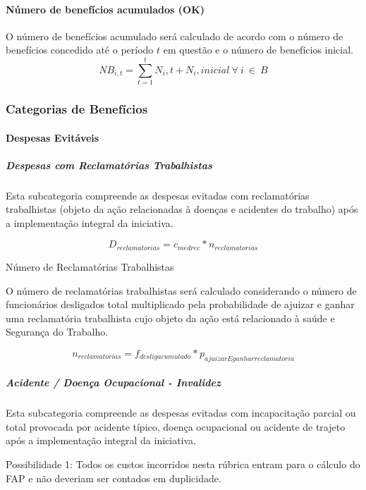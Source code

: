 \documentclass[]{article}
\let\oldparagraph\paragraph
\renewcommand{\paragraph}[1]{\oldparagraph{#1}\mbox{}}
\let\oldsubparagraph\subparagraph
\renewcommand{\subparagraph}[1]{\oldsubparagraph{#1}\mbox{}}
\begin{document}
\paragraph{Número de benefícios acumulados
(OK)}\label{numero-de-beneficios-acumulados-ok}

O número de benefícios acumulado será calculado de acordo com o número
de benefícios concedido até o período \(t\) em questão e o número de
benefícios inicial.
\[NB_{i,t} = \sum_{t=1}^{t} N_i,t + N_i,inicial \ \forall \ i \  \in \ B\]

\subsubsection{Categorias de Benefícios}\label{categorias-de-beneficios}

\paragraph{Despesas Evitáveis}\label{despesas-evitaveis}

\subparagraph{Despesas com Reclamatórias
Trabalhistas}\label{despesas-com-reclamatorias-trabalhistas}

Esta subcategoria compreende as despesas evitadas com reclamatórias
trabalhistas (objeto da ação relacionadas à doenças e acidentes do
trabalho) após a implementação integral da iniciativa.

\[{D}_{reclamatorias} = c_{medrec}*n_{reclamatorias} \]

Número de Reclamatórias Trabalhistas

O número de reclamatórias trabalhistas será calculado considerando o
número de funcionários desligados total multiplicado pela probabilidade
de ajuizar e ganhar uma reclamatória trabalhista cujo objeto da ação
está relacionado à saúde e Segurança do Trabalho.

\[n_{reclamatorias} = f_{desligacumulado} * p_{ajuizarEganharreclamatoria} \]

\subparagraph{Acidente / Doença Ocupacional -
Invalidez}\label{acidente-doenca-ocupacional---invalidez}

Esta subcategoria compreende as despesas evitadas com incapacitação
parcial ou total provocada por acidente típico, doença ocupacional ou
acidente de trajeto após a implementação integral da iniciativa.

Possibilidade 1: Todos os custos incorridos nesta rúbrica entram para o
cálculo do FAP e não deveriam ser contados em duplicidade.
\end{document}
